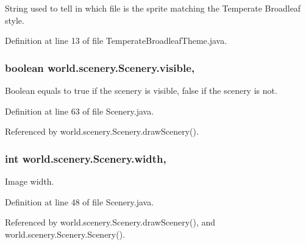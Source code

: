String used to tell in which file is the sprite matching the Temperate Broadleaf style. 



Definition at line 13 of file Temperate\-Broadleaf\-Theme.\-java.

\hypertarget{classworld_1_1scenery_1_1_scenery_a7b22a78d3126c947b7010fdbbea02218}{
\subsubsection[{visible}]{\setlength{\rightskip}{0pt plus 5cm}boolean world.\-scenery.\-Scenery.\-visible\hspace{0.3cm}{\ttfamily [protected]}, {\ttfamily [inherited]}}}\label{classworld_1_1scenery_1_1_scenery_a7b22a78d3126c947b7010fdbbea02218}


Boolean equals to true if the scenery is visible, false if the scenery is not. 



Definition at line 63 of file Scenery.\-java.



Referenced by world.\-scenery.\-Scenery.\-draw\-Scenery().

\hypertarget{classworld_1_1scenery_1_1_scenery_ad10b27080954e2fc06aa1718f47c4ce1}{
\subsubsection[{width}]{\setlength{\rightskip}{0pt plus 5cm}int world.\-scenery.\-Scenery.\-width\hspace{0.3cm}{\ttfamily [protected]}, {\ttfamily [inherited]}}}\label{classworld_1_1scenery_1_1_scenery_ad10b27080954e2fc06aa1718f47c4ce1}


Image width. 



Definition at line 48 of file Scenery.\-java.



Referenced by world.\-scenery.\-Scenery.\-draw\-Scenery(), and world.\-scenery.\-Scenery.\-Scenery().


